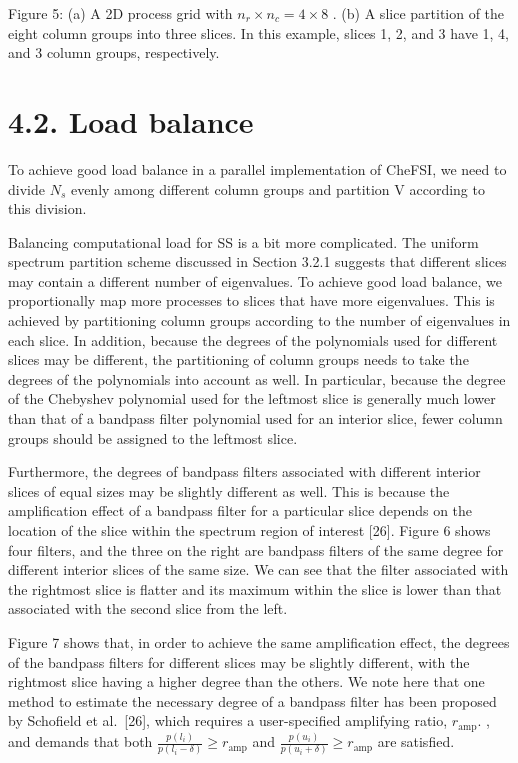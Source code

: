 \documentclass[
  10
]{article}
\begin{document}
Figure 5: (a) A 2D process grid with
\(n _ { r } \times n _ { c } = 4 \times 8\) . (b) A slice partition of
the eight column groups into three slices. In this example, slices 1, 2,
and 3 have 1, 4, and 3 column groups, respectively.

\section{4.2. Load balance}\label{load-balance}

To achieve good load balance in a parallel implementation of CheFSI, we
need to divide \(N _ { s }\) evenly among different column groups and
partition V according to this division.

Balancing computational load for SS is a bit more complicated. The
uniform spectrum partition scheme discussed in Section 3.2.1 suggests
that different slices may contain a different number of eigenvalues. To
achieve good load balance, we proportionally map more processes to
slices that have more eigenvalues. This is achieved by partitioning
column groups according to the number of eigenvalues in each slice. In
addition, because the degrees of the polynomials used for different
slices may be different, the partitioning of column groups needs to take
the degrees of the polynomials into account as well. In particular,
because the degree of the Chebyshev polynomial used for the leftmost
slice is generally much lower than that of a bandpass filter polynomial
used for an interior slice, fewer column groups should be assigned to
the leftmost slice.

Furthermore, the degrees of bandpass filters associated with different
interior slices of equal sizes may be slightly different as well. This
is because the amplification effect of a bandpass filter for a
particular slice depends on the location of the slice within the
spectrum region of interest {[}26{]}. Figure 6 shows four filters, and
the three on the right are bandpass filters of the same degree for
different interior slices of the same size. We can see that the filter
associated with the rightmost slice is flatter and its maximum within
the slice is lower than that associated with the second slice from the
left.

Figure 7 shows that, in order to achieve the same amplification effect,
the degrees of the bandpass filters for different slices may be slightly
different, with the rightmost slice having a higher degree than the
others. We note here that one method to estimate the necessary degree of
a bandpass filter has been proposed by Schofield et al.~{[}26{]}, which
requires a user-specified amplifying ratio,
\(r _ { \mathrm { a m p } } .\) , and demands that both
\(\frac { p ( l _ { i } ) } { p ( l _ { i } - \delta ) } \ge r _ { \mathrm { a m p } }\)
and
\(\frac { p ( u _ { i } ) } { p ( u _ { i } + \delta ) } \ge r _ { \mathrm { a m p } }\)
are satisfied.
\end{document}
